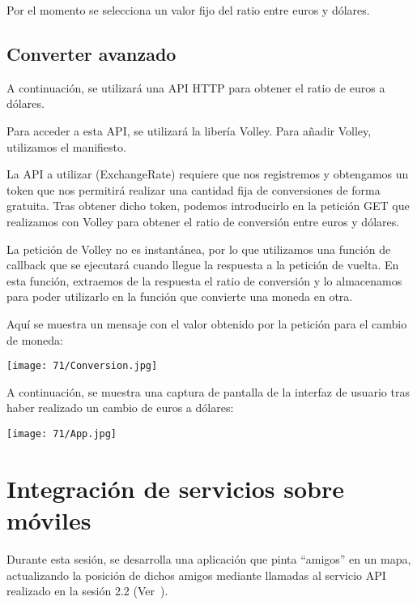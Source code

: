 Por el momento se selecciona un valor fijo del ratio entre euros y dólares.

\subsection{Converter avanzado}
A continuación, se utilizará una API HTTP para obtener el ratio de euros a dólares.

Para acceder a esta API, se utilizará la libería Volley.
Para añadir Volley, utilizamos el manifiesto.

La API a utilizar (ExchangeRate) requiere que nos registremos y obtengamos un token
que nos permitirá realizar una cantidad fija de conversiones de forma gratuita.
Tras obtener dicho token, podemos introducirlo en la petición GET que realizamos con
Volley para obtener el ratio de conversión entre euros y dólares.

La petición de Volley no es instantánea, por lo que utilizamos una función de callback
que se ejecutará cuando llegue la respuesta a la petición de vuelta.
En esta función, extraemos de la respuesta el ratio de conversión y lo almacenamos
para poder utilizarlo en la función que convierte una moneda en otra.

Aquí se muestra un mensaje con el valor obtenido por la petición para el cambio de moneda:

\begin{minipage}{\linewidth}
	\centering
	\texttt{[image: 71/Conversion.jpg]}
	\label{fig:71/1}
\end{minipage}

A continuación, se muestra una captura de pantalla de la interfaz de usuario tras
haber realizado un cambio de euros a dólares:

\begin{minipage}{\linewidth}
	\centering
	\texttt{[image: 71/App.jpg]}
	\label{fig:71/2}
\end{minipage}

\newpage{}
\section{Integración de servicios sobre móviles}\label{sec:7/2}
Durante esta sesión, se desarrolla una aplicación que pinta ``amigos'' en un mapa,
actualizando la posición de dichos amigos mediante llamadas al servicio API realizado
en la sesión 2.2 (Ver~).

